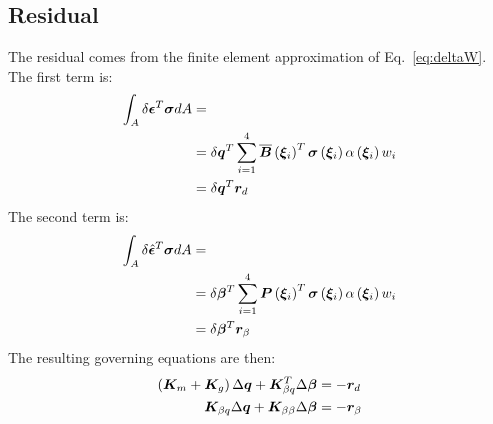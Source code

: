 \subsection{Residual}
The residual comes from the finite element approximation of Eq.~\ref{eq:deltaW}. \\
The first term is:
\begin{equation}
\begin{split}
\int_A \delta{\bm{\epsilon}}^T \bm{\sigma} dA & = \\
& = \delta \bm{q}^T \sum_{i=1}^{4} \overline{\bm{B}}\left(  \bm{ \xi }_{ i }  \right)^T  \bm{\sigma}\left(  \bm{ \xi }_{ i }  \right)  \alpha \left(  \bm{ \xi }_{ i }  \right)  w_i \\
& = \delta \bm{q}^T \bm{r}_{d}
\end{split}
\end{equation}
The second term is:
\begin{equation}
\begin{split}
\int_A \delta \hat{\bm{\epsilon}}^T \bm{\sigma} dA & = \\
& = \delta \bm{\beta}^T \sum_{i=1}^{4} \bm{P}\left(  \bm{ \xi }_{ i }  \right)^T  \bm{\sigma}\left(  \bm{ \xi }_{ i }  \right)  \alpha \left(  \bm{ \xi }_{ i }  \right)  w_i \\
& = \delta \bm{\beta}^T \bm{r}_{\beta}
\end{split}
\end{equation}
The resulting governing equations are then:
\begin{subequations}
\begin{align}
\left(  \bm{K}_m + \bm{K}_g  \right) \Delta \bm{q} + \bm{K}_{\beta q} ^ T \Delta \bm{\beta} & = - \bm{r}_{d} \\
\bm{K}_{\beta q}  \Delta \bm{q} + \bm{K}_{\beta \beta}  \Delta \bm{\beta} & = - \bm{r}_{\beta} \\
\end{align}
\end{subequations}
